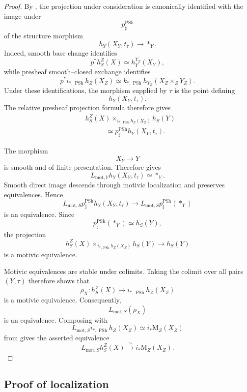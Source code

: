 \begin{proof}
By
,
the projection under consideration is canonically identified with the
image under
\[
    p^{\operatorname{PSh}}_\sharp
\]
of the structure morphism
\[
    h_Y(X_Y,t_\tau)
    \longrightarrow
    *_Y.
\]
Indeed, smooth base change identifies
\[
    p^*h_S^Z(X)
    \simeq
    h_Y^{Y_Z}(X_Y),
\]
while presheaf smooth--closed exchange identifies
\[
    p^*
    i_{*,\operatorname{PSh}}h_Z(X_Z)
    \simeq
    k_{*,\operatorname{PSh}}
    h_{Y_Z}(X_Z\times_ZY_Z).
\]
Under these identifications, the morphism supplied by \(\tau\) is the
point defining
\[
    h_Y(X_Y,t_\tau).
\]
The relative presheaf projection formula therefore gives
\[
\begin{aligned}
    &
    h_S^Z(X)
    \times_{
        i_{*,\operatorname{PSh}}h_Z(X_Z)
    }
    h_S(Y)
    \\
    &\hspace{3em}\simeq
    p^{\operatorname{PSh}}_\sharp
    h_Y(X_Y,t_\tau).
\end{aligned}
\]

The morphism
\[
    X_Y
    \longrightarrow
    Y
\]
is smooth and of finite presentation.  Therefore
gives
\[
    L_{\mathrm{mot},Y}h_Y(X_Y,t_\tau)
    \simeq
    *_Y.
\]
Smooth direct image descends through motivic localization and preserves
equivalences.  Hence
\[
    L_{\mathrm{mot},S}
    p^{\operatorname{PSh}}_\sharp
    h_Y(X_Y,t_\tau)
    \longrightarrow
    L_{\mathrm{mot},S}
    p^{\operatorname{PSh}}_\sharp(*_Y)
\]
is an equivalence.  Since
\[
    p^{\operatorname{PSh}}_\sharp(*_Y)
    \simeq
    h_S(Y),
\]
the projection
\[
    h_S^Z(X)
    \times_{
        i_{*,\operatorname{PSh}}h_Z(X_Z)
    }
    h_S(Y)
    \longrightarrow
    h_S(Y)
\]
is a motivic equivalence.

Motivic equivalences are stable under colimits.  Taking the colimit over
all pairs \((Y,\tau)\) therefore shows that
\[
    \rho_X
    \colon
    h_S^Z(X)
    \longrightarrow
    i_{*,\operatorname{PSh}}h_Z(X_Z)
\]
is a motivic equivalence.  Consequently,
\[
    L_{\mathrm{mot},S}(\rho_X)
\]
is an equivalence.  Composing with
\[
    L_{\mathrm{mot},S}
    i_{*,\operatorname{PSh}}h_Z(X_Z)
    \simeq
    i_*\mathrm M_Z(X_Z)
\]
from
gives the asserted equivalence
\[
    L_{\mathrm{mot},S}h_S^Z(X)
    \xrightarrow{\simeq}
    i_*\mathrm M_Z(X_Z).
\]
\end{proof}

\subsection{Proof of localization}

